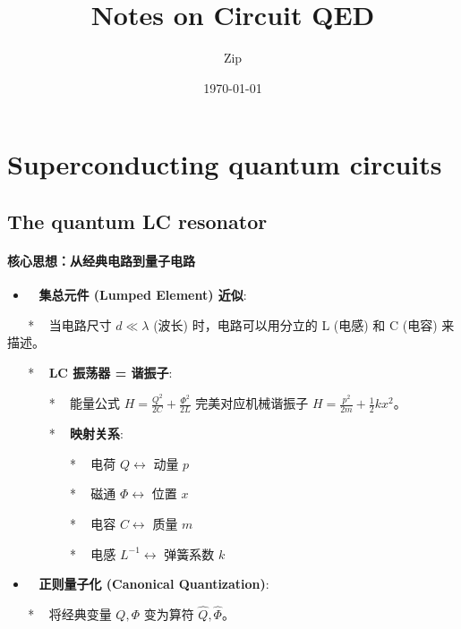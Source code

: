 \documentclass[12pt,a4paper,oneside]{ctexbook}
\title{Notes on Circuit QED}
\author{Zip}
\date{\today}
\providecommand{\tightlist}{%
  \setlength{\itemsep}{0pt}\setlength{\parskip}{0pt}}
\let\oldparagraph\paragraph
\renewcommand{\paragraph}[1]{\oldparagraph{#1}\mbox{}}
\begin{document}
\frontmatter            %
\maketitle
\tableofcontents

\mainmatter             %


\section{Superconducting quantum circuits}

\subsection{The quantum LC
resonator}\label{a.-the-quantum-lc-resonator}

\paragraph{
核心思想：从经典电路到量子电路}\label{ux6838ux5fc3ux601dux60f3ux4eceux7ecfux5178ux7535ux8defux5230ux91cfux5b50ux7535ux8def}

\begin{itemize}
\tightlist
\item
  ~ \textbf{集总元件 (Lumped Element) 近似}:
\end{itemize}

~ ~ * ~ 当电路尺寸 \(d \ll \lambda\) (波长) 时，电路可以用分立的 L
(电感) 和 C (电容) 来描述。

~ ~ * ~ \textbf{LC 振荡器 = 谐振子}:

~ ~ ~ ~ * ~ 能量公式 \(H = \frac{Q^2}{2C} + \frac{\Phi^2}{2L}\)
完美对应机械谐振子 \(H = \frac{p^2}{2m} + \frac{1}{2}kx^2\)。

~ ~ ~ ~ * ~ \textbf{映射关系}:

~ ~ ~ ~ ~ ~ * ~ 电荷 \(Q \leftrightarrow\) 动量 \(p\)

~ ~ ~ ~ ~ ~ * ~ 磁通 \(\Phi \leftrightarrow\) 位置 \(x\)

~ ~ ~ ~ ~ ~ * ~ 电容 \(C \leftrightarrow\) 质量 \(m\)

~ ~ ~ ~ ~ ~ * ~ 电感 \(L^{-1} \leftrightarrow\) 弹簧系数 \(k\)

\begin{itemize}
\tightlist
\item
  ~ \textbf{正则量子化 (Canonical Quantization)}:
\end{itemize}

~ ~ * ~ 将经典变量 \(Q, \Phi\) 变为算符 \(\hat{Q}, \hat{\Phi}\)。
\end{document}
